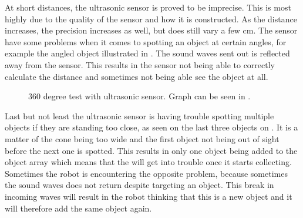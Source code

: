 At short distances, the ultrasonic sensor is proved to be imprecise. This is most highly due to the quality of the sensor and how it is constructed. As the distance increases, the precision increases as well, but does still vary a few cm. The sensor have some problems when it comes to spotting an object at certain angles, for example the angled object illustrated in . The sound waves sent out is reflected away from the sensor. This results in the sensor not being able to correctly calculate the distance and sometimes not being able see the object at all.

\begin{figure}[H]
     \caption{\label{fig:sonar-test-drawing} 360 degree test with ultrasonic sensor. Graph can be seen in .}
\end{figure}

Last but not least the ultrasonic sensor is having trouble spotting multiple objects if they are standing too close, as seen on the last three objects on . It is a matter of the cone being too wide and the first object not being out of sight before the next one is spotted. This results in only one object being added to the object array which means that the \projname{} will get into trouble once it starts collecting.\\
Sometimes the robot is encountering the opposite problem, because sometimes the sound waves does not return despite targeting an object. This break in incoming waves will result in the robot thinking that this is a new object and it will therefore add the same object again.

